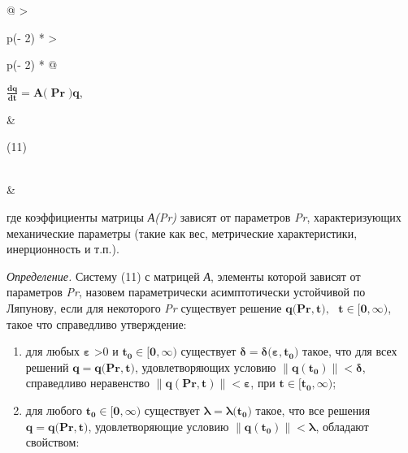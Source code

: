 \begin{longtable}[]{@{}
  >{\raggedright\arraybackslash}p{(\columnwidth - 2\tabcolsep) * }
  >{\raggedright\arraybackslash}p{(\columnwidth - 2\tabcolsep) * }@{}}
\toprule\noalign{}
\begin{minipage}[b]{\linewidth}\raggedright
\(\frac{\mathbf{dq}}{\mathbf{dt}}\mathbf{= A(}\mathbf{\Pr}\mathbf{)}\mathbf{q}\),
\end{minipage} & \begin{minipage}[b]{\linewidth}\raggedright
(11)
\end{minipage} \\
\midrule\noalign{}
\endhead
\bottomrule\noalign{}
\endlastfoot
& \\
\end{longtable}

где коэффициенты матрицы \emph{А(Pr)} зависят от параметров \emph{Pr},
характеризующих механические параметры (такие как вес, метрические
характеристики, инерционность и т.п.).

\emph{Определение.} Систему (11) с матрицей \emph{А}, элементы которой
зависят от параметров \emph{Pr}, назовем параметрически асимптотически
устойчивой по Ляпунову, если для некоторого \emph{Pr} существует решение
\(\mathbf{q(}\mathbf{Pr,}\mathbf{t}\mathbf{),}\text{     }\mathbf{t}\mathbf{\in}\mathbf{\lbrack 0,}\mathbf{\infty}\mathbf{)}\),
такое что справедливо утверждение:

\begin{enumerate}
\def\labelenumi{\arabic{enumi})}
\item
  для любых \(\mathbf{\varepsilon}\) \textgreater0 и
  \(\mathbf{t}_{\mathbf{0}}\mathbf{\in}\mathbf{\lbrack 0,}\mathbf{\infty}\mathbf{)}\)
  существует
  \(\mathbf{\delta = \delta(\varepsilon,}\mathbf{t}_{\mathbf{0}}\mathbf{)}\)
  такое, что для всех решений
  \(\mathbf{q = q(}\mathbf{Pr,}\mathbf{t}\mathbf{)}\), удовлетворяющих
  условию
  \(\left\| \mathbf{q}\left( \mathbf{t}_{\mathbf{0}} \right) \right\|\mathbf{< \delta}\),
  справедливо неравенство
  \(\left\| \mathbf{q}\left( \mathbf{Pr,}\mathbf{t} \right) \right\|\mathbf{< \varepsilon}\),
  при
  \(\mathbf{t}\mathbf{\in}\mathbf{\lbrack}\mathbf{t}_{\mathbf{0}}\mathbf{,}\mathbf{\infty}\mathbf{)}\);
\item
  для любого
  \(\mathbf{t}_{\mathbf{0}}\mathbf{\in}\mathbf{\lbrack 0,}\mathbf{\infty}\mathbf{)}\)
  существует
  \(\mathbf{\lambda = \lambda(}\mathbf{t}_{\mathbf{0}}\mathbf{)}\)
  такое, что все решения
  \(\mathbf{q = q(}\mathbf{Pr,}\mathbf{t}\mathbf{)}\), удовлетворяющие
  условию
  \(\left\| \mathbf{q}\left( \mathbf{t}_{\mathbf{0}} \right) \right\|\mathbf{< \lambda}\),
  обладают свойством:
\end{enumerate}


